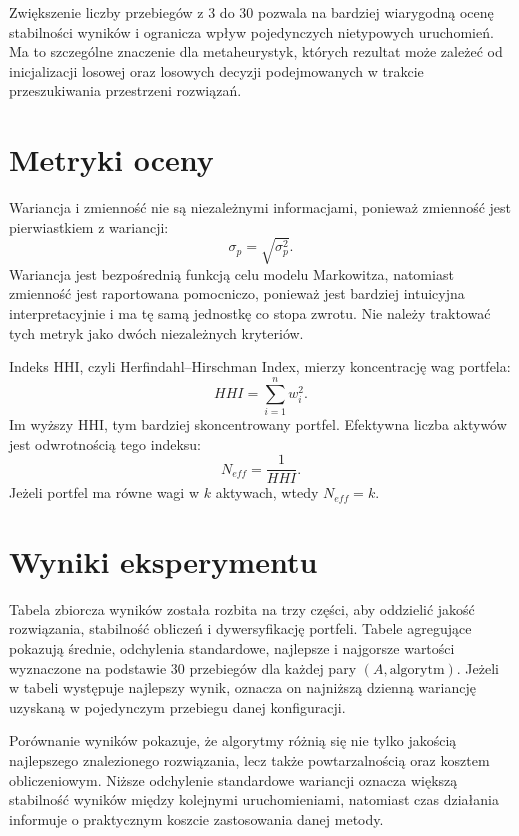 \documentclass[12pt,a4paper]{article}
\begin{document}
Zwiększenie liczby przebiegów z $3$ do $30$ pozwala na bardziej wiarygodną ocenę stabilności wyników i ogranicza wpływ pojedynczych nietypowych uruchomień. Ma to szczególne znaczenie dla metaheurystyk, których rezultat może zależeć od inicjalizacji losowej oraz losowych decyzji podejmowanych w trakcie przeszukiwania przestrzeni rozwiązań.

\section{Metryki oceny}
Wariancja i zmienność nie są niezależnymi informacjami, ponieważ zmienność jest pierwiastkiem z wariancji:
\[
    \sigma_p = \sqrt{\sigma_p^2}.
\]
Wariancja jest bezpośrednią funkcją celu modelu Markowitza, natomiast zmienność jest raportowana pomocniczo, ponieważ jest bardziej intuicyjna interpretacyjnie i ma tę samą jednostkę co stopa zwrotu. Nie należy traktować tych metryk jako dwóch niezależnych kryteriów.

Indeks HHI, czyli Herfindahl--Hirschman Index, mierzy koncentrację wag portfela:
\[
    HHI = \sum_{i=1}^{n} w_i^2.
\]
Im wyższy HHI, tym bardziej skoncentrowany portfel. Efektywna liczba aktywów jest odwrotnością tego indeksu:
\[
    N_{eff} = \frac{1}{HHI}.
\]
Jeżeli portfel ma równe wagi w $k$ aktywach, wtedy $N_{eff}=k$.

\section{Wyniki eksperymentu}



Tabela zbiorcza wyników została rozbita na trzy części, aby oddzielić jakość rozwiązania, stabilność obliczeń i dywersyfikację portfeli. Tabele agregujące pokazują średnie, odchylenia standardowe, najlepsze i najgorsze wartości wyznaczone na podstawie $30$ przebiegów dla każdej pary $(A,\text{algorytm})$. Jeżeli w tabeli występuje najlepszy wynik, oznacza on najniższą dzienną wariancję uzyskaną w pojedynczym przebiegu danej konfiguracji.



\begin{table}[H]
\centering
\caption{Jakość rozwiązań: wariancja, zmienność i zwrot}
\resizebox{\textwidth}{!}{}
\end{table}

Porównanie wyników pokazuje, że algorytmy różnią się nie tylko jakością najlepszego 
znalezionego rozwiązania, lecz także powtarzalnością oraz kosztem obliczeniowym. 
Niższe odchylenie standardowe wariancji oznacza większą stabilność wyników między 
kolejnymi uruchomieniami, natomiast czas działania informuje o praktycznym koszcie 
zastosowania danej metody.
\end{document}
